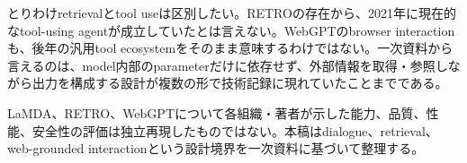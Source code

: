とりわけretrievalとtool useは区別したい。RETROの存在から、2021年に現在的なtool-using agentが成立していたとは言えない。WebGPTのbrowser interactionも、後年の汎用tool ecosystemをそのまま意味するわけではない。一次資料から言えるのは、model内部のparameterだけに依存せず、外部情報を取得・参照しながら出力を構成する設計が複数の形で技術記録に現れていたことまでである。\autocite{src-66643bb115ae,src-6ab2302937b2,src-72eada5e8850,src-bb1464aabad9}


\begin{claimboundary}
LaMDA、RETRO、WebGPTについて各組織・著者が示した能力、品質、性能、安全性の評価は独立再現したものではない。本稿はdialogue、retrieval、web-grounded interactionという設計境界を一次資料に基づいて整理する。\autocite{src-66643bb115ae,src-6ab2302937b2,src-72eada5e8850,src-a3971b3f646f,src-bb1464aabad9}
\end{claimboundary}

